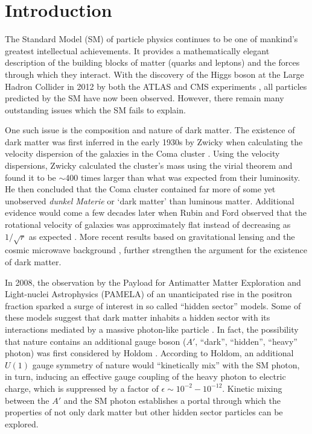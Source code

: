 
\chapter{Introduction}

The Standard Model (SM) of particle physics continues to be one of mankind's 
greatest intellectual achievements.  It provides a mathematically elegant 
description of the building blocks of matter (quarks and leptons) and the 
forces through which they interact.  With the discovery of the Higgs boson at the
Large Hadron Collider in 2012 by both the ATLAS and CMS experiments
\cite{Aad:2012tfa, Chatrchyan:2012xdj}, all particles predicted by the SM have
now been observed.  However, there remain many outstanding issues which the SM
fails to explain.  

One such issue is the composition and nature of dark matter. The 
existence of dark matter was first inferred in the early 1930s by Zwicky when
calculating the velocity dispersion of the galaxies in the Coma cluster 
\cite{Zwicky:1933gu}.  Using the velocity dispersions, Zwicky calculated the 
cluster's mass using the virial theorem and found it to be $\sim$400 times 
larger than what was expected from their luminosity.  He then concluded that 
the Coma cluster contained far more of some yet unobserved \emph{dunkel Materie}
or `dark matter' than luminous matter.  Additional evidence would come 
a few decades later when Rubin and Ford observed that the rotational velocity
of galaxies was approximately flat instead of decreasing as $1/\sqrt{r}$ as 
expected \cite{Rubin:1980zd}.  More recent results based on gravitational
lensing \cite{Clowe:2006eq} and the cosmic microwave background 
\cite{Adam:2015rua}, further strengthen the argument for the existence of dark 
matter.

In 2008, the observation by the Payload for Antimatter Matter Exploration and 
Light-nuclei Astrophysics (PAMELA) of an unanticipated rise in the positron 
fraction \cite{Adriani:2008zr} sparked a surge of interest in so called 
``hidden sector'' models.  Some of these models suggest that dark matter 
inhabits a hidden sector with its interactions mediated by a massive 
photon-like particle \cite{ArkaniHamed:2008qn, Pospelov:2008jd, Hooper:2012cw}.
In fact, the possibility that nature contains an 
additional gauge boson  ($A'$, ``dark'', ``hidden'', ``heavy'' photon) was 
first considered by Holdom \cite{Holdom:1985ag}.  According to Holdom, 
an additional $U(1)$ gauge
symmetry of nature would ``kinetically mix'' with the SM photon, in turn, 
inducing an effective gauge coupling of the heavy photon to electric charge, 
which is suppressed by a factor of $\epsilon \sim 10^{-2} - 10^{-12}$.  
Kinetic mixing between the $A'$ and the SM photon establishes a portal through which
the properties of not only dark matter but other hidden sector particles can be
explored.

